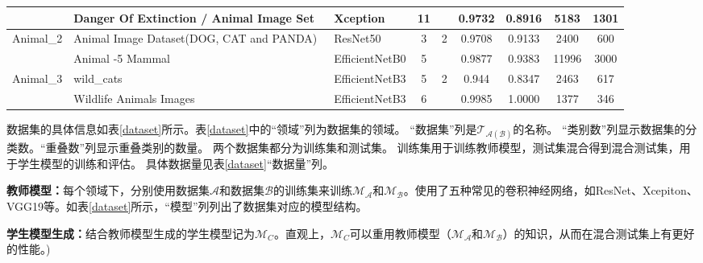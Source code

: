 \documentclass[fontset=macnew,UTF8]{article} %
\begin{document}
\begin{table}[t]
{\begin{tabular}{|l|l|l|c|c|cc|cc|}
				& Danger Of Extinction / Animal   Image Set~\cite{DangerOfExtinction}  & Xception               & 11                          &                                         & \multicolumn{1}{c|}{0.9732}    & 0.8916   & \multicolumn{1}{c|}{5183}       & 1301                           \\ \hline
				\multirow{2}{*}{Animal\_2} & Animal Image Dataset(DOG, CAT and PANDA)~\cite{AnimalImageDataset}   & ResNet50               & 3                           & \multirow{2}{*}{2}                      & \multicolumn{1}{c|}{0.9708}    & 0.9133   & \multicolumn{1}{c|}{2400}       & 600                            \\ \cline{2-4} \cline{6-9} 
				& Animal -5 Mammal~\cite{Animal5Mammal}                           & EfficientNetB0         & 5                           &                                         & \multicolumn{1}{c|}{0.9877}    & 0.9383   & \multicolumn{1}{c|}{11996}      & 3000                           \\ \hline
				\multirow{2}{*}{Animal\_3} & wild\_cats~\cite{wildCats}                                 & EfficientNetB3         & 5                           & \multirow{2}{*}{2}                      & \multicolumn{1}{c|}{0.944}     & 0.8347   & \multicolumn{1}{c|}{2463}       & 617                            \\ \cline{2-4} \cline{6-9} 
				& Wildlife Animals Images~\cite{WildlifeAnimalsImages}                    & EfficientNetB3         & 6                           &                                         & \multicolumn{1}{c|}{0.9985}    & 1.0000   & \multicolumn{1}{c|}{1377}       & 346                            \\ \hline
			\end{tabular}
		}
	\end{table}


数据集的具体信息如表\ref{dataset}所示。表\ref{dataset}中的“领域”列为数据集的领域。 “数据集”列是$\mathcal{T_{A(B)}}$的名称。 “类别数”列显示数据集的分类数。“重叠数”列显示重叠类别的数量。 两个数据集都分为训练集和测试集。 训练集用于训练教师模型，测试集混合得到混合测试集，用于学生模型的训练和评估。 具体数据量见表\ref{dataset}“数据量”列。

\textbf{教师模型：}每个领域下，分别使用数据集$\mathcal{A}$和数据集$\mathcal{B}$的训练集来训练$\mathcal{M_A}$和$\mathcal{M_B}$。使用了五种常见的卷积神经网络，如ResNet、Xcepiton、VGG19等。如表\ref{dataset}所示，“模型”列列出了数据集对应的模型结构。

\textbf{学生模型生成：}结合教师模型生成的学生模型记为$\mathcal{M}_C$。直观上，$\mathcal{M}_C$可以重用教师模型（$\mathcal{M_A}$和$\mathcal{M_B}$）的知识，从而在混合测试集上有更好的性能。)
\end{document}
